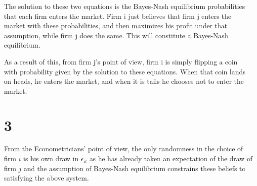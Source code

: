 \documentclass[12pt]{paper}
\begin{document}
The solution to these two equations is the Bayes-Nash equilibrium
probabilities that each firm enters the market. Firm i just believes
that firm j enters the market with these probabilities, and then
maximizes his profit under that assumption, while firm j does the
same. This will constitute a Bayes-Nash equilibrium.

As a result of this, from firm j's point of view, firm i is simply
flipping a coin with probability given by the solution to these
equations. When that coin lands on heads, he enters the market, and
when it is tails he chooses not to enter the market. 


\section{3}

From the Econometricians' point of view, the only randomness in the
choice of firm $i$ is his own draw in $\epsilon_{it}$ as he has already taken
an expectation of the draw of firm $j$ and the assumption of
Bayes-Nash equilibrium constrains these beliefs to satisfying the
above system. 
\end{document}
